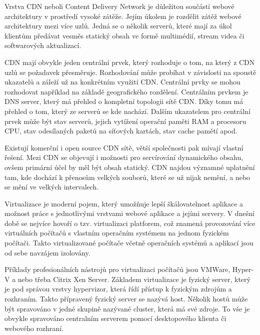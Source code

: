 \documentclass[12pt]{article}
\begin{document}
\obrazek
{}


Vrstva CDN neboli Content Delivery Network je důležitou součástí webové architektury v prostředí vysoké zátěže. Jejím úkolem je rozdělit zátěž webové architektury mezi více uzlů. Jedná se o několik serverů, které mají za úkol klientům předávat vesměs statický obsah ve formě multimédií, stream videa či softwarových aktualizací. 

CDN mají obvykle jeden centrální prvek, který rozhoduje o tom, na který z CDN uzlů se požadavek přesměruje. Rozhodování může probíhat v závislosti na spoustě ukazatelů a záleží už na konkrétním využití CDN. Centrální prvky se mohou rozhodovat například na základě geografického rozdělení. Centrálním prvkem je DNS server, který má přehled o kompletní topologii sítě CDN. Díky tomu má přehled o tom, který ze serverů se kde nachází. Dalším ukazatelem pro centrální prvek může být stav serverů, jejich vytížení operační paměti RAM a procesoru CPU, stav odesílaných paketů na síťových kartách, stav cache pamětí apod. 

Existují komerční i open source CDN sítě, větší společnosti pak mívají vlastní řešení. Mezi CDN se objevují i možnosti pro servírování dynamického obsahu, ovšem primární účel by měl být obsah statický. CDN najdou významné uplatnění tam, kde dochází k přenosům velkých souborů, které se už nijak nemění, a nebo se mění ve velkých intervalech.\cite{cdn}

\obrazek
{}


Virtualizace je moderní pojem, který umožňuje lepší škálovatelnost aplikace a možnost práce s jednotlivými vrstvami webové aplikace a jejími servery. V dnešní době se nejvíce hovoří o tzv. virtualizaci platforem, což znamená provozování více virtuálních počítačů s vlastním operačním systémem na jednom fyzickém počítači. Takto virtualizované počítače včetně operačních systémů a aplikací jsou od sebe navzájem izolovány. 

Příklady profesionálních nástrojů pro virtualizaci počítačů jsou VMWare, Hyper-V a nebo třeba Citrix Xen Server. Základem virtualizace je fyzický server, který je pod správou vrstvy hypervizor, která řídí přístup k fyzickým zdrojům a rozhraním. Takto přípravený fyzický server se nazývá host. Několik hostů může být spravováno v jedné skupině nazývané cluster, která má své zdroje. To vše je obvykle spravováno centralním serverem pomocí desktopového klienta či webového rozhraní.
\end{document}

